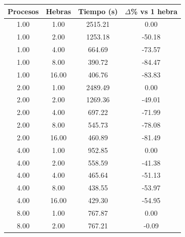 \begin{table}[ht]
    \centering
    \begin{tabular}{|c|c|c|c|}
        \hline
        \textbf{Procesos} & \textbf{Hebras} & \textbf{Tiempo (s)} & \textbf{$\Delta$\% vs 1 hebra} \\
        \hline
        1.00              & 1.00            & 2515.21             & 0.00                           \\
        1.00              & 2.00            & 1253.18             & -50.18                         \\
        1.00              & 4.00            & 664.69              & -73.57                         \\
        1.00              & 8.00            & 390.72              & -84.47                         \\
        1.00              & 16.00           & 406.76              & -83.83                         \\
        2.00              & 1.00            & 2489.49             & 0.00                           \\
        2.00              & 2.00            & 1269.36             & -49.01                         \\
        2.00              & 4.00            & 697.22              & -71.99                         \\
        2.00              & 8.00            & 545.73              & -78.08                         \\
        2.00              & 16.00           & 460.89              & -81.49                         \\
        4.00              & 1.00            & 952.85              & 0.00                           \\
        4.00              & 2.00            & 558.59              & -41.38                         \\
        4.00              & 4.00            & 465.64              & -51.13                         \\
        4.00              & 8.00            & 438.55              & -53.97                         \\
        4.00              & 16.00           & 429.30              & -54.95                         \\
        8.00              & 1.00            & 767.87              & 0.00                           \\
        8.00              & 2.00            & 767.21              & -0.09                          \\

\end{tabular}
\end{table}
